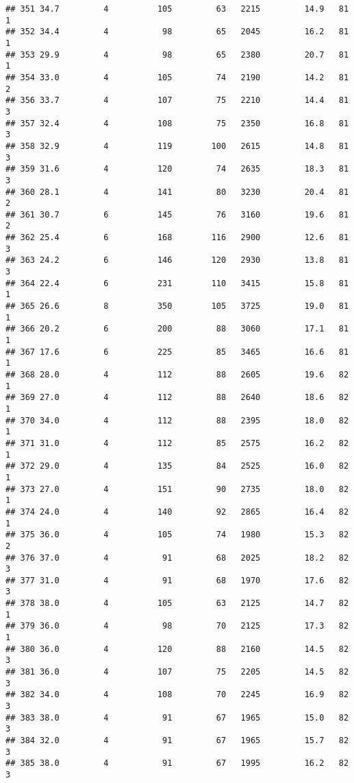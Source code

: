 \documentclass[
]{article}
\begin{document}
\begin{verbatim}
## 351 34.7         4          105         63   2215         14.9   81      1
## 352 34.4         4           98         65   2045         16.2   81      1
## 353 29.9         4           98         65   2380         20.7   81      1
## 354 33.0         4          105         74   2190         14.2   81      2
## 356 33.7         4          107         75   2210         14.4   81      3
## 357 32.4         4          108         75   2350         16.8   81      3
## 358 32.9         4          119        100   2615         14.8   81      3
## 359 31.6         4          120         74   2635         18.3   81      3
## 360 28.1         4          141         80   3230         20.4   81      2
## 361 30.7         6          145         76   3160         19.6   81      2
## 362 25.4         6          168        116   2900         12.6   81      3
## 363 24.2         6          146        120   2930         13.8   81      3
## 364 22.4         6          231        110   3415         15.8   81      1
## 365 26.6         8          350        105   3725         19.0   81      1
## 366 20.2         6          200         88   3060         17.1   81      1
## 367 17.6         6          225         85   3465         16.6   81      1
## 368 28.0         4          112         88   2605         19.6   82      1
## 369 27.0         4          112         88   2640         18.6   82      1
## 370 34.0         4          112         88   2395         18.0   82      1
## 371 31.0         4          112         85   2575         16.2   82      1
## 372 29.0         4          135         84   2525         16.0   82      1
## 373 27.0         4          151         90   2735         18.0   82      1
## 374 24.0         4          140         92   2865         16.4   82      1
## 375 36.0         4          105         74   1980         15.3   82      2
## 376 37.0         4           91         68   2025         18.2   82      3
## 377 31.0         4           91         68   1970         17.6   82      3
## 378 38.0         4          105         63   2125         14.7   82      1
## 379 36.0         4           98         70   2125         17.3   82      1
## 380 36.0         4          120         88   2160         14.5   82      3
## 381 36.0         4          107         75   2205         14.5   82      3
## 382 34.0         4          108         70   2245         16.9   82      3
## 383 38.0         4           91         67   1965         15.0   82      3
## 384 32.0         4           91         67   1965         15.7   82      3
## 385 38.0         4           91         67   1995         16.2   82      3

\end{verbatim}
\end{document}
